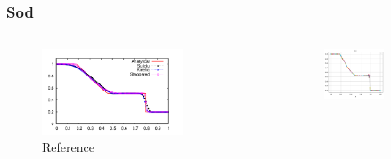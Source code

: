 \documentclass[pt12]{beamer}
\begin{document}
\begin{frame}\frametitle{Sod}


    \begin{columns}

        \begin{column}{0.40\textwidth}
        
\begin{figure}
     \centering
         \includegraphics[width=0.9\textwidth]{figures/sod/reference.png}
         \caption{Reference}
\end{figure}
   		\end{column}
        \begin{column}{0.60\textwidth}
\begin{figure}
     \centering
     \begin{subfigure}[b]{0.40\textwidth}
         \centering
         \includegraphics[width=\textwidth]{figures/sod/o2.pdf}

\end{subfigure}
\end{figure}
\end{column}
\end{columns}
\end{frame}
\end{document}

